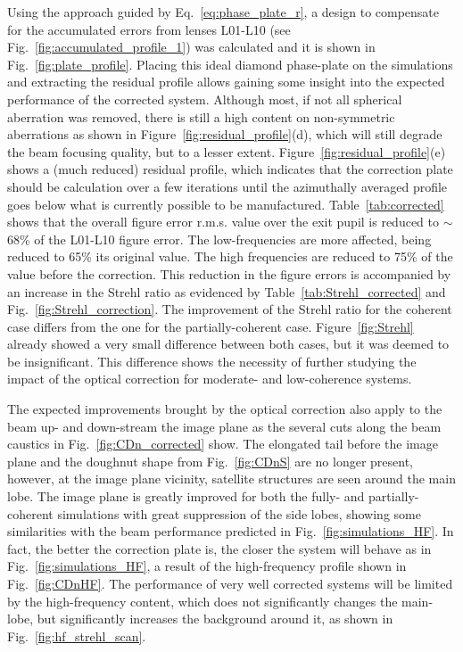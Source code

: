 \begin{refsection}
Using the approach guided by Eq.~\ref{eq:phase_plate_r}, a design to compensate for the accumulated errors from lenses L01-L10 (see  Fig.~\ref{fig:accumulated_profile_1}) was calculated and it is shown in Fig.~\ref{fig:plate_profile}. Placing this ideal diamond phase-plate on the simulations and extracting the residual profile allows gaining some insight into the expected performance of the corrected system. Although most, if not all spherical aberration was removed, there is still a high content on non-symmetric aberrations as shown in Figure~\ref{fig:residual_profile}(d), which will still degrade the beam focusing quality, but to a lesser extent. Figure~\ref{fig:residual_profile}(e) shows a (much reduced) residual profile, which indicates that the correction plate should be calculation over a few iterations until the azimuthally averaged profile goes below what is currently possible to be manufactured. Table~\ref{tab:corrected} shows that the overall figure error r.m.s. value over the exit pupil is reduced to $\sim$68\% of the L01-L10 figure error. The low-frequencies are more affected, being reduced to 65\% its original value. The high frequencies are reduced to 75\% of the value before the correction. This reduction in the figure errors is accompanied by an increase in the Strehl ratio as evidenced by Table~\ref{tab:Strehl_corrected} and Fig.~\ref{fig:Strehl_correction}. The improvement of the Strehl ratio for the coherent case differs from the one for the partially-coherent case. Figure~\ref{fig:Strehl} already showed a very small difference between both cases, but it was deemed to be insignificant. This difference shows the necessity of further studying the impact of the optical correction for moderate- and low-coherence systems.

The expected improvements brought by the optical correction also apply to the beam up- and down-stream the image plane as the several cuts along the beam caustics in Fig.~\ref{fig:CDn_corrected} show. The elongated tail before the image plane and the doughnut shape from Fig.~\ref{fig:CDnS} are no longer present, however, at the image plane vicinity, satellite structures are seen around the main lobe. The image plane is greatly improved for both the fully- and partially-coherent simulations with great suppression of the side lobes, showing some similarities with the beam performance predicted in Fig.~\ref{fig:simulations_HF}. In fact, the better the correction plate is, the closer the system will behave as in Fig.~\ref{fig:simulations_HF}, a result of the high-frequency profile shown in Fig.~\ref{fig:CDnHF}. The performance of very well corrected systems will be limited by the high-frequency content, which does not significantly changes the main-lobe, but significantly increases the background around it, as shown in Fig.~\ref{fig:hf_strehl_scan}.


\end{refsection}
